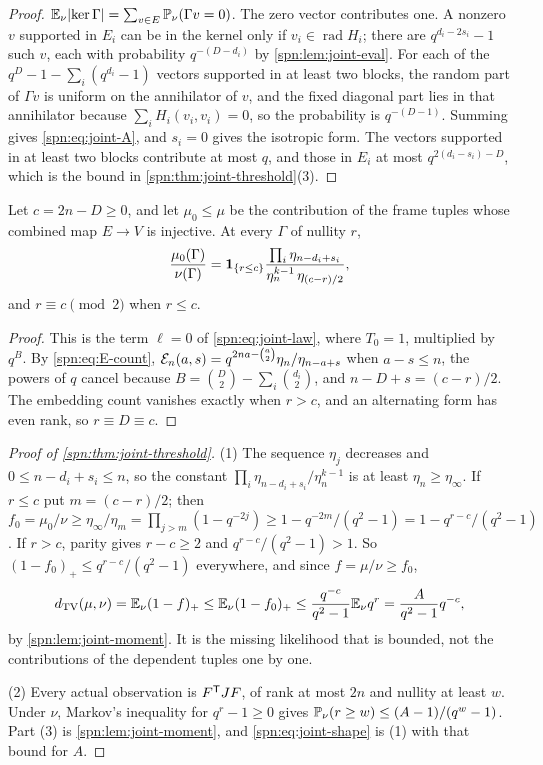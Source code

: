 \begin{proof}
$\mathbb{E}_\nu\lvert\ker\Gamma\rvert=\sum_{v\in E}\mathbb{P}_\nu(\Gamma v=0)$. The zero vector contributes one. A
nonzero $v$ supported in $E_i$ can be in the kernel only if $v_i\in\operatorname{rad}H_i$; there are
$q^{d_i-2s_i}-1$ such $v$, each with probability $q^{-(D-d_i)}$ by \cref{spn:lem:joint-eval}. For
each of the $q^D-1-\sum_i(q^{d_i}-1)$ vectors supported in at least two blocks, the random part of
$\Gamma v$ is uniform on the annihilator of $v$, and the fixed diagonal part lies in that annihilator
because $\sum_iH_i(v_i,v_i)=0$, so the probability is $q^{-(D-1)}$. Summing gives
\eqref{spn:eq:joint-A}, and $s_i=0$ gives the isotropic form. The vectors supported in at least two
blocks contribute at most $q$, and those in $E_i$ at most $q^{2(d_i-s_i)-D}$, which is the bound in
\cref{spn:thm:joint-threshold}(3).
\end{proof}

\begin{lemma}\label{spn:lem:joint-injective}
Let $c=2n-D\ge0$, and let $\mu_0\le\mu$ be the contribution of the frame tuples whose combined map
$E\to V$ is injective. At every $\Gamma$ of nullity $r$,
\[
 \frac{\mu_0(\Gamma)}{\nu(\Gamma)}=\mathbf 1_{\{r\le c\}}
 \frac{\prod_i\eta_{n-d_i+s_i}}{\eta_n^{k-1}\,\eta_{(c-r)/2}} ,
\]
and $r\equiv c\pmod2$ when $r\le c$.
\end{lemma}

\begin{proof}
This is the term $\ell=0$ of \eqref{spn:eq:joint-law}, where $T_0=1$, multiplied by $q^B$. By
\eqref{spn:eq:E-count}, $\mathcal{E}_n(a,s)=q^{2na-\binom a2}\eta_n/\eta_{n-a+s}$ when $a-s\le n$, the
powers of $q$ cancel because $B=\binom D2-\sum_i\binom{d_i}2$, and $n-D+s=(c-r)/2$. The embedding
count vanishes exactly when $r>c$, and an alternating form has even rank, so $r\equiv D\equiv c$.
\end{proof}

\begin{proof}[Proof of \cref{spn:thm:joint-threshold}]
(1) The sequence $\eta_j$ decreases and $0\le n-d_i+s_i\le n$, so the constant
$\prod_i\eta_{n-d_i+s_i}/\eta_n^{k-1}$ is at least $\eta_n\ge\eta_\infty$. If $r\le c$ put
$m=(c-r)/2$; then $f_0=\mu_0/\nu\ge\eta_\infty/\eta_m=\prod_{j>m}(1-q^{-2j})\ge1-q^{-2m}/(q^2-1)
=1-q^{r-c}/(q^2-1)$. If $r>c$, parity gives $r-c\ge2$ and $q^{r-c}/(q^2-1)>1$. So
$(1-f_0)_+\le q^{r-c}/(q^2-1)$ everywhere, and since $f=\mu/\nu\ge f_0$,
\[
 d_{\mathrm{TV}}(\mu,\nu)=\mathbb{E}_\nu(1-f)_+\le\mathbb{E}_\nu(1-f_0)_+\le\frac{q^{-c}}{q^2-1}\mathbb{E}_\nu q^r
 =\frac{A}{q^2-1}q^{-c},
\]
by \cref{spn:lem:joint-moment}. It is the missing likelihood that is bounded, not the
contributions of the dependent tuples one by one.

(2) Every actual observation is $F^{\mathsf{T}}JF$, of rank at most $2n$ and nullity at least $w$. Under
$\nu$, Markov's inequality for $q^r-1\ge0$ gives $\mathbb{P}_\nu(r\ge w)\le(A-1)/(q^w-1)$. Part (3) is
\cref{spn:lem:joint-moment}, and \eqref{spn:eq:joint-shape} is (1) with that bound for $A$.
\end{proof}

